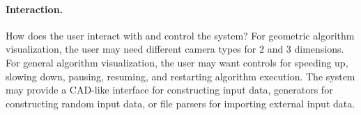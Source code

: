 % 



\paragraph{Interaction.} How does the user interact with and control the system?
For geometric algorithm visualization, the user may need different camera types
for 2 and 3 dimensions. For general algorithm visualization, the user may want
controls for speeding up, slowing down, pausing, resuming, and restarting
algorithm execution. The system may provide a CAD-like interface for
constructing input data, generators for constructing random input data, or file
parsers for importing external input data. 

